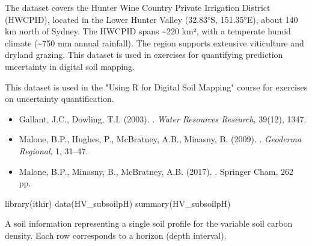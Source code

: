 \documentclass[a4paper]{book}
\begin{document}
%
\begin{Details}
The dataset covers the Hunter Wine Country Private Irrigation District (HWCPID), located in the Lower Hunter Valley (32.83°S, 151.35°E), about 140 km north of Sydney. The HWCPID spans \textasciitilde{}220 km², with a temperate humid climate (\textasciitilde{}750 mm annual rainfall). The region supports extensive viticulture and dryland grazing. This dataset is used in exercises for quantifying prediction uncertainty in digital soil mapping.
\end{Details}
%
\begin{Note}
This dataset is used in the "Using R for Digital Soil Mapping" course for exercises on uncertainty quantification.
\end{Note}
%
\begin{References}
\begin{itemize}

\item{} Gallant, J.C., Dowling, T.I. (2003). . \emph{Water Resources Research}, 39(12), 1347.
\item{} Malone, B.P., Hughes, P., McBratney, A.B., Minasny, B. (2009). . \emph{Geoderma Regional}, 1, 31–47.
\item{} Malone, B.P., Minasny, B., McBratney, A.B. (2017). . Springer Cham, 262 pp.

\end{itemize}

\end{References}
%
\begin{Examples}
\begin{ExampleCode}
library(ithir)
data(HV_subsoilpH)
summary(HV_subsoilpH)
\end{ExampleCode}
\end{Examples}
%
\begin{Description}
A soil information  representing a single soil profile for the variable soil carbon density. Each row corresponds to a horizon (depth interval).
\end{Description}
%
\end{document}
